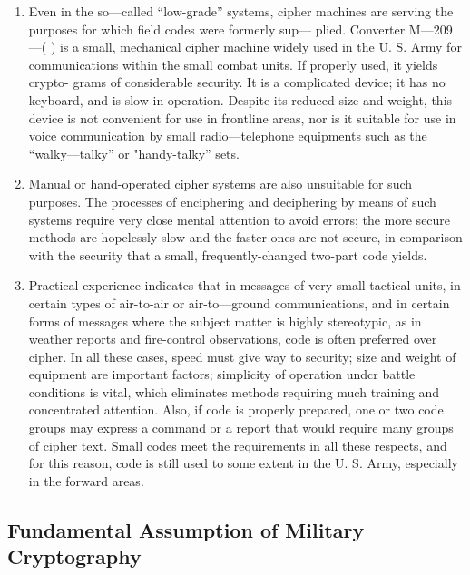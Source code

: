 \mypara \begin{enumerate}
\item Even in the so—called “low-grade” systems, cipher machines are
serving the purposes for which ﬁeld codes were formerly sup—
plied. Converter M—209—( ) is a small, mechanical cipher
machine widely used in the U. S. Army for communications
within the small combat units. If properly used, it yields crypto-
grams of considerable security. It is a complicated device; it
has no keyboard, and is slow in operation. Despite its reduced
size and weight, this device is not convenient for use in frontline areas, nor is it suitable for use in voice communication by
small radio—telephone equipments such as the “walky—talky” or
"handy-talky” sets.

\item Manual or hand-operated cipher systems are also unsuitable for
such purposes. The processes of enciphering and deciphering by
means of such systems require very close mental attention to
avoid errors; the more secure methods are hopelessly slow and
the faster ones are not secure, in comparison with the security
that a small, frequently-changed two-part code yields.

\item Practical experience indicates that in messages of very small
tactical units, in certain types of air-to-air or air-to—ground
communications, and in certain forms of messages where the
subject matter is highly stereotypic, as in weather reports and
ﬁre-control observations, code is often preferred over cipher.
In all these cases, speed must give way to security; size and
weight of equipment are important factors; simplicity of
operation undcr battle conditions is vital, which eliminates
methods requiring much training and concentrated attention.
Also, if code is properly prepared, one or two code groups may
express a command or a report that would require many groups
of cipher text. Small codes meet the requirements in all these
respects, and for this reason, code is still used to some extent
in the U. S. Army, especially in the forward areas.
\end{enumerate}

\subsection{Fundamental Assumption of Military Cryptography}

